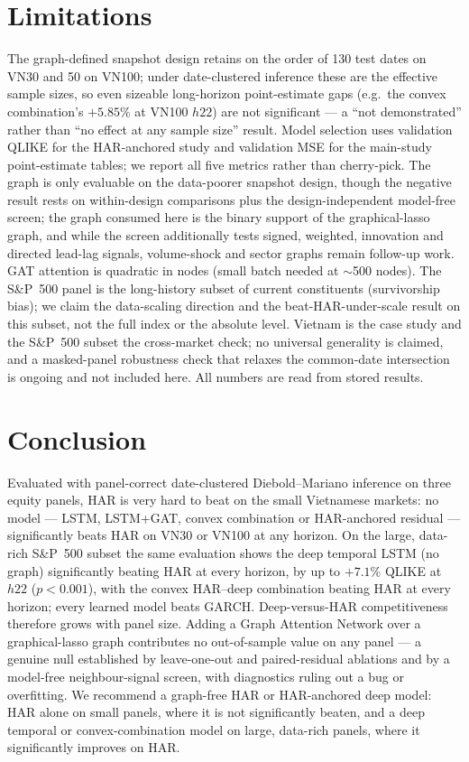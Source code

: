 \documentclass[runningheads]{llncs}
\begin{document}
\section{Limitations}
The graph-defined snapshot design retains on the order of 130 test dates on VN30 and 50 on VN100; under
date-clustered inference these are the effective sample sizes, so even sizeable long-horizon point-estimate
gaps (e.g.\ the convex combination's $+5.85\%$ at VN100 $h22$) are not significant --- a ``not demonstrated''
rather than ``no effect at any sample size'' result. Model selection uses validation QLIKE for the
HAR-anchored study and validation MSE for the main-study point-estimate tables; we report all five metrics
rather than cherry-pick. The graph is only evaluable on the data-poorer snapshot design, though the negative
result rests on within-design comparisons plus the design-independent model-free screen; the graph consumed
here is the binary support of the graphical-lasso graph, and while the screen additionally tests signed,
weighted, innovation and directed lead-lag signals, volume-shock and sector graphs remain follow-up work. GAT
attention is quadratic in nodes (small batch needed at $\sim$500 nodes). The S\&P~500 panel is the
long-history subset of current constituents (survivorship bias); we claim the data-scaling direction and the
beat-HAR-under-scale result on this subset, not the full index or the absolute level. Vietnam is the case
study and the S\&P~500 subset the cross-market check; no universal generality is claimed, and a masked-panel
robustness check that relaxes the common-date intersection is ongoing and not included here. All numbers are
read from stored results.

\section{Conclusion}
Evaluated with panel-correct date-clustered Diebold--Mariano inference on three equity panels, HAR is very
hard to beat on the small Vietnamese markets: no model --- LSTM, LSTM+GAT, convex combination or HAR-anchored
residual --- significantly beats HAR on VN30 or VN100 at any horizon. On the large, data-rich S\&P~500 subset
the same evaluation shows the deep temporal LSTM (no graph) significantly beating HAR at every horizon, by up
to $+7.1\%$ QLIKE at $h22$ ($p<0.001$), with the convex HAR--deep combination beating HAR at every horizon;
every learned model beats GARCH. Deep-versus-HAR competitiveness therefore grows with panel size. Adding a
Graph Attention Network over a graphical-lasso graph contributes no out-of-sample value on any panel --- a
genuine null established by leave-one-out and paired-residual ablations and by a model-free neighbour-signal
screen, with diagnostics ruling out a bug or overfitting. We recommend a graph-free HAR or HAR-anchored deep
model: HAR alone on small panels, where it is not significantly beaten, and a deep temporal or
convex-combination model on large, data-rich panels, where it significantly improves on HAR.
\end{document}
